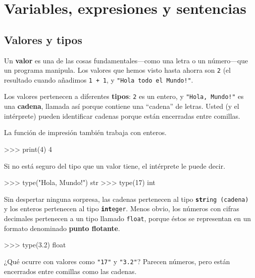 
\chapter{Variables, expresiones y sentencias}

\section{Valores y tipos}

  

Un \textbf{valor} es una de las cosas fundamentales—como una letra
o un número—que un programa manipula. Los valores que hemos visto
hasta ahorra son \texttt{2} (el resultado cuando añadimos \texttt{1
+ 1}, y {\verb+"Hola todo el Mundo!"+}.

Los valores pertenecen a diferentes \textbf{tipos}: \texttt{2} es
un entero, y {\verb+"Hola, Mundo!"+} es una \textbf{cadena}, llamada
así porque contiene una ``cadena'' de letras. Usted (y el intérprete)
pueden identificar cadenas porque están encerradas entre comillas.

La función de impresión también trabaja con enteros.

\begin{pyconcode}
>>> print(4)
4
\end{pyconcode}
 

Si no está seguro del tipo que un valor tiene, el intérprete le puede
decir.

\begin{pyconcode}
>>> type("Hola, Mundo!")
str
>>> type(17)
int
\end{pyconcode}
 

Sin despertar ninguna sorpresa, las cadenas pertenecen al tipo \texttt{\textbf{str}}\texttt{ing
(cadena)} y los enteros pertenecen al tipo \texttt{\textbf{int}}\texttt{eger}.
Menos obvio, los números con cifras decimales pertenecen a un tipo
llamado \texttt{float}, porque éstos se representan en un formato
denominado \textbf{punto flotante}.

    
 

\begin{pyconcode}
>>> type(3.2)
float
\end{pyconcode}

¿Qué ocurre con valores como {\verb+"17"+} y {\verb+"3.2"+}?
Parecen números, pero están encerrados entre comillas como las cadenas.

